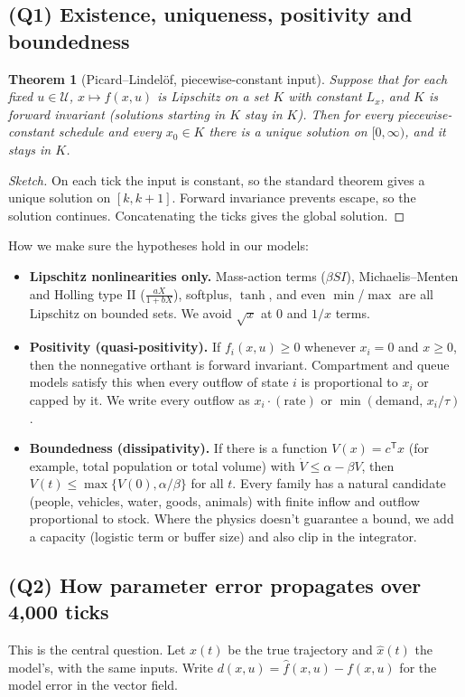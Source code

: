 \documentclass[11pt]{article}
\theoremstyle{plain}
\newtheorem{theorem}{Theorem}[section]
\theoremstyle{definition}
\theoremstyle{remark}
\newcommand{\tr}{\mathsf{T}}
\begin{document}
\subsection{(Q1) Existence, uniqueness, positivity and boundedness}
\begin{theorem}[Picard--Lindelöf, piecewise-constant input]\label{thm:pl}
Suppose that for each fixed $u\in\mathcal U$, $x\mapsto f(x,u)$ is Lipschitz on a set $K$ with constant $L_x$, and $K$ is forward invariant (solutions starting in $K$ stay in $K$). Then for every piecewise-constant schedule and every $x_0\in K$ there is a unique solution on $[0,\infty)$, and it stays in $K$.
\end{theorem}
\begin{proof}[Sketch]
On each tick the input is constant, so the standard theorem gives a unique solution on $[k,k+1]$. Forward invariance prevents escape, so the solution continues. Concatenating the ticks gives the global solution.
\end{proof}
How we make sure the hypotheses hold in our models:
\begin{itemize}
\item \textbf{Lipschitz nonlinearities only.} Mass-action terms ($\beta SI$), Michaelis--Menten and Holling type II ($\frac{aX}{1+bX}$), softplus, $\tanh$, and even $\min$/$\max$ are all Lipschitz on bounded sets. We avoid $\sqrt{x}$ at $0$ and $1/x$ terms.
\item \textbf{Positivity (quasi-positivity).} If $f_i(x,u)\ge0$ whenever $x_i=0$ and $x\ge0$, then the nonnegative orthant is forward invariant. Compartment and queue models satisfy this when every outflow of state $i$ is proportional to $x_i$ or capped by it. We write every outflow as $x_i\cdot(\text{rate})$ or $\min(\text{demand},\,x_i/\tau)$.
\item \textbf{Boundedness (dissipativity).} If there is a function $V(x)=c^\tr x$ (for example, total population or total volume) with $\dot V\le \alpha-\beta V$, then $V(t)\le\max\{V(0),\alpha/\beta\}$ for all $t$. Every family has a natural candidate (people, vehicles, water, goods, animals) with finite inflow and outflow proportional to stock. Where the physics doesn't guarantee a bound, we add a capacity (logistic term or buffer size) and also clip in the integrator.
\end{itemize}

\subsection{(Q2) How parameter error propagates over 4,000 ticks}
This is the central question. Let $x(t)$ be the true trajectory and $\hat x(t)$ the model's, with the same inputs. Write $d(x,u)=\hat f(x,u)-f(x,u)$ for the model error in the vector field.
\end{document}
